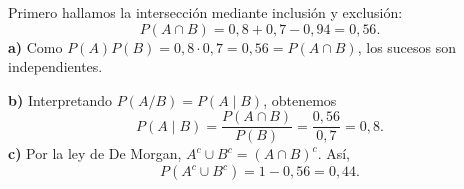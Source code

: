 Primero hallamos la intersección mediante inclusión y exclusión:
\[
 P(A\cap B)=0{,}8+0{,}7-0{,}94=0{,}56.
\]
\textbf{a)} Como $P(A)P(B)=0{,}8\cdot0{,}7=0{,}56=P(A\cap B)$, los sucesos son independientes.

\textbf{b)} Interpretando $P(A/B)=P(A\mid B)$, obtenemos
\[
 P(A\mid B)=\frac{P(A\cap B)}{P(B)}=\frac{0{,}56}{0{,}7}=\boxed{0{,}8}.
\]
\textbf{c)} Por la ley de De Morgan, $A^c\cup B^c=(A\cap B)^c$. Así,
\[
 P(A^c\cup B^c)=1-0{,}56=\boxed{0{,}44}.
\]
